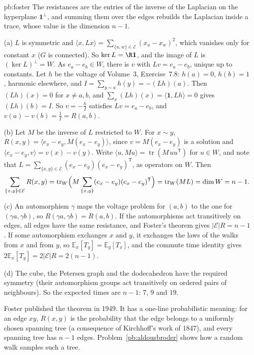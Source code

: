 \begin{solution}{pb:foster}
\idea The resistances are the entries of the inverse of the Laplacian on the hyperplane $\mathbf 1^\perp$, and summing them over the edges rebuilds
the Laplacian inside a trace, whose value is the dimension $n-1$.

\writeup (a) $L$ is symmetric and $\langle x,Lx\rangle=\sum_{\{u,w\}\in\mathcal E}(x_u-x_w)^2$, which vanishes only for constant $x$ ($G$ is connected). So $\ker L=\R\mathbf 1$, and the image of $L$ is
$(\ker L)^\perp=W$. As $e_a-e_b\in W$, there is $v$ with $Lv=e_a-e_b$, unique up to constants. Let $h$ be the voltage of Volume~3, Exercise~7.8: $h(a)=0$,
$h(b)=1$, harmonic elsewhere, and $I=\sum_{y\sim a}h(y)=-(Lh)(a)$. Then $(Lh)(x)=0$ for $x\ne a,b$, and $\sum_x(Lh)(x)=\langle\mathbf1,Lh\rangle=0$ gives $(Lh)(b)=I$. So $v=-\frac hI$
satisfies $Lv=e_a-e_b$, and $v(a)-v(b)=\frac1I=R(a,b)$.

(b) Let $M$ be the inverse of $L$ restricted to $W$. For $x\sim y$, $R(x,y)=\langle e_x-e_y,M(e_x-e_y)\rangle$, since $v=M(e_x-e_y)$ is a solution and $\langle e_x-e_y,v\rangle=v(x)-v(y)$. Write
$\langle u,Mu\rangle=\operatorname{tr}(M\,uu^{\mathsf T})$ for $u\in W$, and note that $L=\sum_{\{x,y\}\in\mathcal E}(e_x-e_y)(e_x-e_y)^{\mathsf T}$, as operators on $W$. Then
\[
\sum_{\{x,y\}\in\mathcal E}R(x,y)=\operatorname{tr}_W\Bigl(M\sum_{\{x,y\}}(e_x-e_y)(e_x-e_y)^{\mathsf T}\Bigr)=\operatorname{tr}_W(ML)=\dim W=n-1.
\]

(c) An automorphism $\gamma$ maps the voltage problem for $(a,b)$ to the one for $(\gamma a,\gamma b)$, so $R(\gamma a,\gamma b)=R(a,b)$. If the automorphisms act transitively
on edges, all edges have the same resistance, and Foster's theorem gives $|\mathcal E|R=n-1$. If some automorphism exchanges $x$ and $y$, it
exchanges the laws of the walks from $x$ and from $y$, so $\mathbb E_x[T_y]=\mathbb E_y[T_x]$, and the commute time identity gives $2\mathbb E_x[T_y]=2|\mathcal E|R=2(n-1)$.

(d) The cube, the Petersen graph and the dodecahedron have the required symmetry (their automorphism groups act transitively on
ordered pairs of neighbours). So the expected times are $n-1$: $7$, $9$ and $19$.

\leads Foster published the theorem in 1949. It has a one-line probabilistic meaning: for an edge $xy$, $R(x,y)$ is the probability that the
edge belongs to a uniformly chosen spanning tree (a consequence of Kirchhoff's work of 1847), and every spanning tree has $n-1$ edges.
Problem~\ref{pb:aldousbroder} shows how a random walk samples such a tree.
\end{solution}

